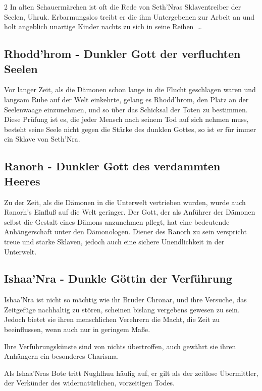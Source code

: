 \begin{multicols*}{2}
In alten Schauermärchen ist oft die Rede von Seth'Nras Sklaventreiber der Seelen, Uhruk.
Erbarmungslos treibt er die ihm Untergebenen zur Arbeit an und holt angeblich unartige Kinder nachts zu sich in seine Reihen …

\subsection{Rhodd'hrom - Dunkler Gott der verfluchten Seelen}\label{subsec:rhodd'hrom-dunkler-gott-der-verfluchten-seelen}

Vor langer Zeit, als die Dämonen schon lange in die Flucht geschlagen waren und langsam Ruhe auf der Welt einkehrte, gelang es Rhodd'hrom, den Platz an der Seelenwaage einzunehmen, und so über das Schicksal der Toten zu bestimmen.
Diese Prüfung ist es, die jeder Mensch nach seinem Tod auf sich nehmen muss, besteht seine Seele nicht gegen die Stärke des dunklen Gottes, so ist er für immer ein Sklave von Seth'Nra.

\subsection{Ranorh - Dunkler Gott des verdammten Heeres}\label{subsec:ranorh-dunkler-gott-des-verdammten-heeres}

Zu der Zeit, als die Dämonen in die Unterwelt vertrieben wurden, wurde auch Ranorh's Einfluß auf die Welt geringer.
Der Gott, der als Anführer der Dämonen selbst die Gestalt eines Dämons anzunehmen pflegt, hat eine bedeutende Anhängerschaft unter den Dämonologen.
Diener des Ranorh zu sein verspricht treue und starke Sklaven, jedoch auch eine sichere Unendlichkeit in der Unterwelt.

\subsection{Ishaa'Nra - Dunkle Göttin der Verführung}\label{subsec:ishaa'nra-dunkle-gottin-der-verfuhrung}

Ishaa'Nra ist nicht so mächtig wie ihr Bruder Chronar, und ihre Versuche, das Zeitgefüge nachhaltig zu stören, scheinen bislang vergebens gewesen zu sein.
Jedoch bietet sie ihren menschlichen Verehrern die Macht, die Zeit zu beeinflussen, wenn auch nur in geringem Maße.

Ihre Verführungskünste sind von nichts übertroffen, auch gewährt sie ihren Anhängern ein besonderes Charisma.

Als Ishaa'Nras Bote tritt Nughlhuu häufig auf, er gilt als der zeitlose Übermittler, der Verkünder des widernatürlichen, vorzeitigen Todes.


\end{multicols*}
